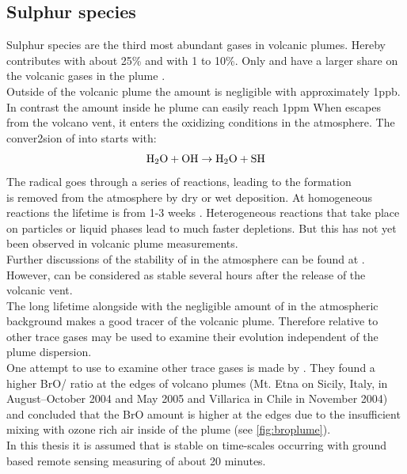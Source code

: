 \documentclass  [
  paper    = a4,
  BCOR     = 10mm,
  twoside,
  fontsize = 12pt,
  fleqn,
  toc      = bibnumbered,
  toc      = listofnumbered,
  numbers  = noendperiod,
  headings = normal,
  listof   = leveldown,
  version  = 3.03
]                                       {scrreprt}
\begin{document}
\subsection{Sulphur species\label{chap:so2}}
Sulphur species are the third most abundant gases in volcanic plumes. Hereby  contributes with about 25\% and  with 1 to 10\%. Only  and  have a larger share on the volcanic gases in the plume .\\
Outside of the volcanic plume the   amount is negligible with approximately 1ppb. In contrast the   amount inside he plume can easily reach 1ppm \cite{Coppenheimer 2003}
When  escapes from the volcano vent, it enters the oxidizing conditions in the atmosphere. The conver2sion of  into  starts with:
\begin{equation*}
\ce{H2O}+\ce{OH}\rightarrow \ce{H2O}+\ce{SH}
\end{equation*}
The  radical goes through a series of reactions, leading to the  formation \cite{Seinfeld}\\
 is removed from the atmosphere by dry or wet
deposition. At homogeneous reactions the lifetime is from 1-3 weeks \cite{robock2000volcanic}. Heterogeneous reactions that take place on particles or liquid phases lead to much faster depletions. But this has not yet been observed in volcanic plume measurements.\\
Further discussions of the stability of   in the atmosphere can be found at \cite{lubcke2014optical}.\\
However,  can be considered as stable several hours after the release of the volcanic vent.\\ The long lifetime  alongside with the negligible amount of  in the atmospheric background makes  a good tracer of the volcanic plume.
Therefore relative to other trace gases  may be used to examine their evolution independent of the plume dispersion.\\
One attempt to use  to examine other trace gases is made by \cite{bobrowski2007reactive}. They found a higher BrO/ ratio at the edges of volcano plumes (Mt. Etna on Sicily, Italy, in August–October 2004 and May 2005 and Villarica in Chile in November 2004) and concluded that the BrO amount is higher at the edges due to the insufficient mixing with ozone rich air inside of the plume (see \ref{fig:broplume}).\\
In this thesis it is assumed that   is stable on time-scales occurring with ground based remote sensing measuring of about 20 minutes. \\
\end{document}
